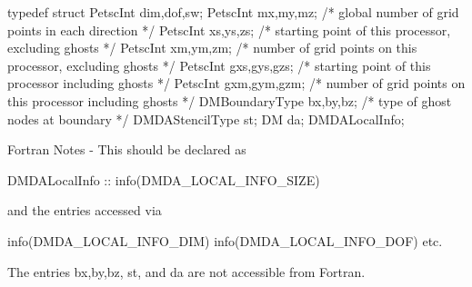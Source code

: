 typedef struct {
  PetscInt         dim,dof,sw;
  PetscInt         mx,my,mz;    /* global number of grid points in each direction */
  PetscInt         xs,ys,zs;    /* starting point of this processor, excluding ghosts */
  PetscInt         xm,ym,zm;    /* number of grid points on this processor, excluding ghosts */
  PetscInt         gxs,gys,gzs;    /* starting point of this processor including ghosts */
  PetscInt         gxm,gym,gzm;    /* number of grid points on this processor including ghosts */
  DMBoundaryType   bx,by,bz; /* type of ghost nodes at boundary */
  DMDAStencilType  st;
  DM               da;
} DMDALocalInfo;

Fortran Notes - This should be declared as

   DMDALocalInfo :: info(DMDA_LOCAL_INFO_SIZE)

and the entries accessed via

   info(DMDA_LOCAL_INFO_DIM)
   info(DMDA_LOCAL_INFO_DOF) etc.

   The entries bx,by,bz, st, and da are not accessible from Fortran.
   
